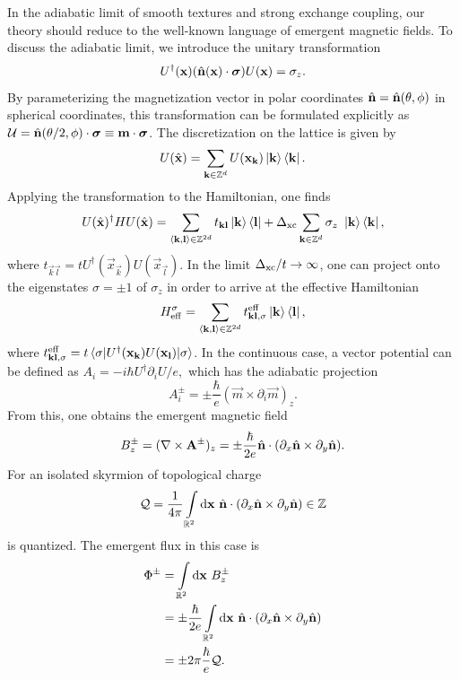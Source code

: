 \documentclass[
    10pt,
    aps,
    prb,
	longbibliography,
    twocolumn,
    floatfix,
    superscriptaddress,
]{revtex4-2}
\begin{document}
In the adiabatic limit of smooth textures and strong exchange coupling, our theory should reduce to the well-known language of emergent magnetic fields.
To discuss the adiabatic limit, we introduce the unitary transformation
\begin{equation}
	U^\dagger(\mathbf{x}) ( \hat{\mathbf{n}}(\mathbf{x})\cdot \boldsymbol{\sigma} ) U(\mathbf{x})  = \sigma_z .
\end{equation}
By parameterizing the magnetization vector in polar coordinates $\hat{\mathbf{n}} = \hat{\mathbf{n}}(\theta, \phi)$ in spherical coordinates, this transformation can be formulated explicitly as $\mathcal{U} = \hat{\mathbf{n}}(\theta/2, \phi)\cdot \boldsymbol{\sigma} \equiv \mathbf{m} \cdot \boldsymbol{\sigma}$.
The discretization on the lattice is given by
\begin{equation}
	U( \hat{\mathbf{x}}) = \sum_{\mathbf{k} \in \mathbb{Z}^d} U( \mathbf{x}_{\mathbf{k}} )\ket{\mathbf{k}} \bra{\mathbf{k}} .
\end{equation}
Applying the transformation to the Hamiltonian, one finds
\begin{align}
	U( \hat{\mathbf{x}})^\dagger H  U( \hat{\mathbf{x}}) = \sum_{\braket{\mathbf{k},\mathbf{l}} \in \mathbb{Z}^{2d}} t_{\mathbf{k}\mathbf{l}} \ket{\mathbf{k}}\bra{\mathbf{l}}
	+ \Delta_\mathrm{xc}\sum_{\mathbf{k} \in \mathbb{Z}^d}  \sigma_z ~ \ket{\mathbf{k}}\bra{\mathbf{k}} ,
\end{align}
where $t_{\vec{k}\vec{l}} = t U^\dagger(\vec{x}_\vec{k}) U(\vec{x}_\vec{l})$.
In the limit $\Delta_\mathrm{xc} / t \to \infty$, one can project onto the eigenstates $\sigma = \pm 1$ of $\sigma_z$ in order to arrive at the effective Hamiltonian
\begin{equation}
	H_\mathrm{eff}^\sigma
	= \sum_{\braket{\mathbf{k},\mathbf{l}} \in \mathbb{Z}^{2d}} t_{\mathbf{k}\mathbf{l}, \sigma}^{\mathrm{eff}} \ket{\mathbf{k}}\bra{\mathbf{l}},
\end{equation}
where
$
t_{\mathbf{k}\mathbf{l}, \sigma}^{\mathrm{eff}} =t  \braket{\sigma |  U^\dagger(\mathbf{x}_{\mathbf{k}}) U(\mathbf{x}_{\mathbf{l}})  | \sigma }
$.
In the continuous case, a vector potential can be defined as
$
A_i = - i \hbar U^\dagger \partial_i U  / e ,
$
which has the adiabatic projection
\begin{equation}
	A_i^{\pm} = \pm \frac{\hbar}{e} ( \vec{m} \times \partial_i \vec{m} )_z .
\end{equation}
From this, one obtains the emergent magnetic field
\begin{equation}
	B_z^\pm 
	= (\nabla \times \mathbf{A}^\pm)_z = \pm \frac{\hbar}{2 e} \hat{\mathbf{n}} \cdot (\partial_x \hat{\mathbf{n}} \times \partial_y \hat{\mathbf{n}}) .
\end{equation}
For an isolated skyrmion of topological charge 
\begin{equation}
	\mathcal{Q} = \frac{1}{4 \pi}\int\limits_{\mathbb{R}^2} \mathrm{d} \mathbf{x}~ \hat{\mathbf{n}} \cdot (\partial_x \hat{\mathbf{n}} \times \partial_y \hat{\mathbf{n}}) \in \mathbb{Z}
\end{equation}
is quantized.
The emergent flux in this case is
\begin{align}
	\Phi^\pm & = \int\limits_{\mathbb{R}^2} \mathrm{d} \mathbf{x}~ B_z^\pm 
    \notag \\
	& =\pm \frac{\hbar}{2 e} \int\limits_{\mathbb{R}^2} \mathrm{d} \mathbf{x}~ \hat{\mathbf{n}} \cdot (\partial_x \hat{\mathbf{n}} \times \partial_y \hat{\mathbf{n}})
    \notag \\
	&=\pm 2 \pi \frac{\hbar}{ e}  \mathcal{Q} .
\end{align}
\end{document}
